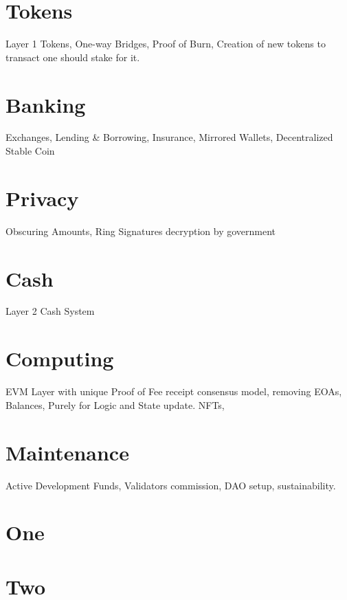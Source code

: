 \documentclass[a4paper,10pt]{article}
\begin{document}
\section{Tokens}
Layer 1 Tokens, One-way Bridges, Proof of Burn, Creation of new tokens to transact one should stake for it.

\section{Banking}
Exchanges, Lending \& Borrowing, Insurance, Mirrored Wallets, Decentralized Stable Coin

\section{Privacy}
Obscuring Amounts, Ring Signatures decryption by government

\section{Cash}
Layer 2 Cash System 

\section{Computing}
EVM Layer with unique Proof of Fee receipt consensus model, removing EOAs, Balances, Purely for Logic and State update. NFTs, 

\section{Maintenance}
Active Development Funds, Validators commission, DAO setup, sustainability.


\appendix

\section{One}

\section{Two}
\end{document}

